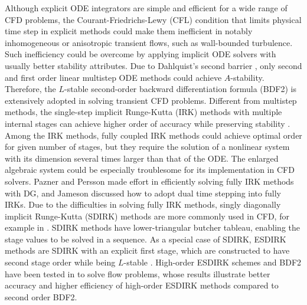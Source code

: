 \documentclass[preprint,12pt]{elsarticle}
\begin{document}
Although explicit ODE integrators
are simple and efficient for a wide range of
CFD problems,
the Courant-Friedrichs-Lewy (CFL) condition
that limits physical time step in explicit
methods could make them inefficient in
notably inhomogeneous or anisotropic
transient flows,
such as wall-bounded turbulence.
Such inefficiency could be overcome by
applying implicit ODE solvers with
usually better stability attributes.
Due to Dahlquist's second barrier
\cite{dahlquist1963special},
only second and first order linear multistep ODE methods
could achieve $A$-stability. 
Therefore, 
the $L$-stable
second-order backward differentiation formula (BDF2)
is extensively adopted in solving transient CFD problems.
Different from multistep methods,
the single-step implicit Runge-Kutta (IRK) methods
with multiple internal stages
can achieve higher order of accuracy while
preserving stability \cite{butcher2016ODEBook}.
Among the IRK methods, fully coupled IRK methods
could achieve optimal order
for given number of stages,
but they require the solution of a nonlinear
system with its dimension several times larger
than that of the ODE. 
The enlarged algebraic system
could be especially troublesome for its implementation in
CFD solvers.
Pazner and Persson
\cite{pazner2017stage}
made effort in efficiently solving
fully IRK methods with DG, and
Jameson \cite{jameson2017evaluation}
discussed how to adopt dual time stepping
into fully IRKs.
Due to the difficulties in solving
fully IRK methods,
singly diagonally implicit Runge-Kutta (SDIRK)
methods are more commonly used in CFD, for example in
\cite{wang2017compact_VR}.
SDIRK methods have lower-triangular butcher tableau,
enabling the stage values to be solved in a sequence.
As a special case of SDIRK,
ESDIRK methods are SDIRK with an explicit first stage,
which are constructed to have
second stage order while being $L$-stable
\cite{kennedy2003additiveARK,kvaerno2004singly}.
High-order ESDIRK schemes and
BDF2 have been tested in
\cite{
    bijl2002implicitBDFvESDIRK,
    wang2007implicitDGTests}
to solve flow problems,
whose results illustrate
better accuracy and higher efficiency
of high-order ESDIRK methods
compared to second order BDF2.
\end{document}
